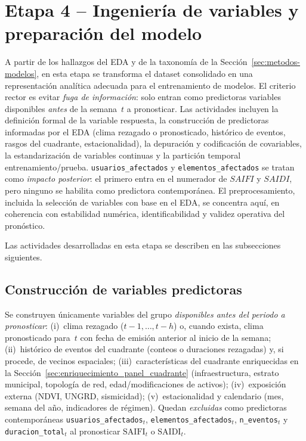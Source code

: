\section{Etapa 4 – Ingeniería de variables y preparación del modelo}
\label{sec:metodología-etapa4}

A partir de los hallazgos del EDA y de la taxonomía de la Sección~\ref{sec:metodos-modelos}, en esta etapa se transforma el dataset consolidado en una representación analítica adecuada para el entrenamiento de modelos. El criterio rector es evitar \textit{fuga de información}: solo entran como predictoras variables disponibles \emph{antes} de la semana~$t$ a pronosticar. Las actividades incluyen la definición formal de la variable respuesta, la construcción de predictoras informadas por el EDA (clima rezagado o pronosticado, histórico de eventos, rasgos del cuadrante, estacionalidad), la depuración y codificación de covariables, la estandarización de variables continuas y la partición temporal entrenamiento/prueba. \texttt{usuarios\_afectados} y \texttt{elementos\_afectados} se tratan como \textit{impacto posterior}: el primero entra en el numerador de $SAIFI$ y $SAIDI$, pero ninguno se habilita como predictora contemporánea. El preprocesamiento, incluida la selección de variables con base en el EDA, se concentra aquí, en coherencia con estabilidad numérica, identificabilidad y validez operativa del pronóstico.

Las actividades desarrolladas en esta etapa se describen en las subsecciones siguientes.

\subsection{Construcción de variables predictoras}
Se construyen únicamente variables del grupo \textit{disponibles antes del periodo a pronosticar}: (i)~clima rezagado ($t-1,\ldots,t-h$) o, cuando exista, clima pronosticado para~$t$ con fecha de emisión anterior al inicio de la semana; (ii)~histórico de eventos del cuadrante (conteos o duraciones rezagadas) y, si procede, de vecinos espaciales; (iii)~características del cuadrante enriquecidas en la Sección~\ref{sec:enriquecimiento_panel_cuadrante} (infraestructura, estrato municipal, topología de red, edad/modificaciones de activos); (iv)~exposición externa (NDVI, UNGRD, sismicidad); (v)~estacionalidad y calendario (mes, semana del año, indicadores de régimen). Quedan \textit{excluidas} como predictoras contemporáneas \texttt{usuarios\_afectados}$_t$, \texttt{elementos\_afectados}$_t$, \texttt{n\_eventos}$_t$ y \texttt{duracion\_total}$_t$ al pronosticar $\mathrm{SAIFI}_t$ o $\mathrm{SAIDI}_t$.

